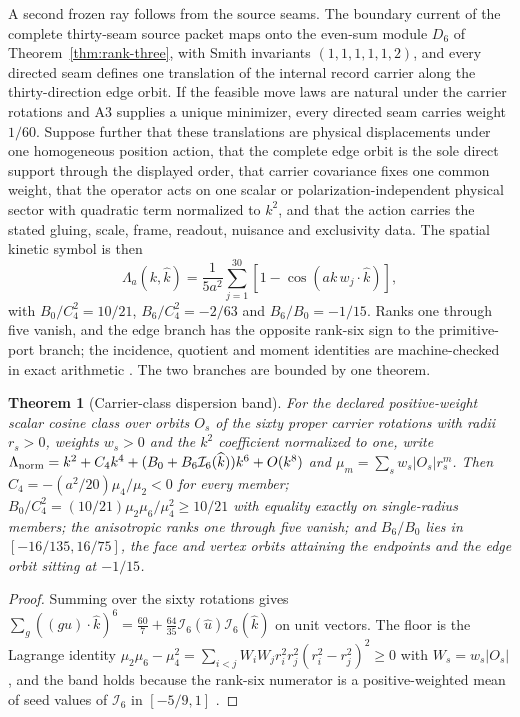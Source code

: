 \documentclass[11pt]{article}
\newtheorem{theorem}{Theorem}[section]
\theoremstyle{definition}
\theoremstyle{remark}
\begin{document}
A second frozen ray follows from the source seams. The boundary current of
the complete thirty-seam source packet maps onto the even-sum module $D_6$
of Theorem~\ref{thm:rank-three}, with Smith invariants $(1,1,1,1,1,2)$, and
every directed seam defines one translation of the internal record carrier
along the thirty-direction edge orbit. If the feasible move laws are natural
under the carrier rotations and A3 supplies a unique minimizer, every
directed seam carries weight $1/60$. Suppose further that these
translations are physical displacements under one homogeneous position
action, that the complete edge orbit is the sole direct support through
the displayed order, that carrier covariance fixes one common weight,
that the operator acts on one scalar or polarization-independent physical
sector with quadratic term normalized to $k^2$, and that the action
carries the stated gluing, scale, frame, readout, nuisance and
exclusivity data. The spatial kinetic symbol is then
\begin{equation}
\Lambda_a(k,\widehat k)=\frac{1}{5a^2}\sum_{j=1}^{30}
 \left[1-\cos\!\left(ak\,w_j\!\cdot\!\widehat k\right)\right],
\label{eq:seam-edge-symbol}
\end{equation}
with $B_0/C_4^2=10/21$, $B_6/C_4^2=-2/63$ and $B_6/B_0=-1/15$. Ranks one
through five vanish, and the edge branch has the opposite rank-six sign to
the primitive-port branch; the incidence, quotient and moment identities
are machine-checked in exact arithmetic \cite{ophrepo}. The two branches
are bounded by one theorem.

\begin{theorem}[Carrier-class dispersion band]
\label{thm:carrier-class-band}
For the declared positive-weight scalar cosine class over orbits $O_s$ of the
sixty proper carrier rotations with radii $r_s>0$, weights $w_s>0$ and the
$k^2$ coefficient normalized to one, write
$\Lambda_{\rm norm}=k^2+C_4k^4+(B_0+B_6\mathcal I_6(\widehat k))k^6+O(k^8)$
and $\mu_m=\sum_sw_s|O_s|r_s^m$. Then $C_4=-(a^2/20)\mu_4/\mu_2<0$ for every
member; $B_0/C_4^2=(10/21)\mu_2\mu_6/\mu_4^2\ge10/21$ with equality exactly
on single-radius members; the anisotropic ranks one through five vanish; and
$B_6/B_0$ lies in $[-16/135,16/75]$, the face and vertex orbits attaining the
endpoints and the edge orbit sitting at $-1/15$.
\end{theorem}

\begin{proof}
Summing over the sixty rotations gives
$\sum_g((gu)\!\cdot\!\widehat k)^6=\tfrac{60}{7}
+\tfrac{64}{35}\mathcal I_6(\widehat u)\mathcal I_6(\widehat k)$ on unit
vectors. The floor is the Lagrange identity
$\mu_2\mu_6-\mu_4^2=\sum_{i<j}W_iW_jr_i^2r_j^2(r_i^2-r_j^2)^2\ge0$ with $W_s=w_s|O_s|$, and the
band holds because the rank-six numerator is a positive-weighted mean of seed
values of $\mathcal I_6$ in $[-5/9,1]$ \cite{ophrepo}.
\end{proof}
\end{document}

